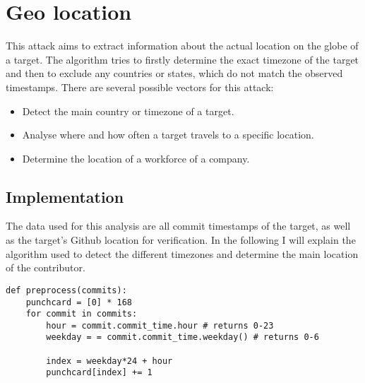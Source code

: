 \section{Geo location}

This attack aims to extract information about the actual location on the globe of a target.
The algorithm tries to firstly determine the exact timezone of the target and then to exclude any countries or states, which do not match the observed timestamps.
There are several possible vectors for this attack:

\begin{itemize}
    \item Detect the main country or timezone of a target.
    \item Analyse where and how often a target travels to a specific location.
    \item Determine the location of a workforce of a company.
\end{itemize}


\subsection{Implementation}\label{travel-implementation}

The data used for this analysis are all commit timestamps of the target, as well as the target's Github location for verification.
In the following I will explain the algorithm used to detect the different timezones and determine the main location of the contributor.

\begin{verbatim}
def preprocess(commits):
    punchcard = [0] * 168
    for commit in commits:
        hour = commit.commit_time.hour # returns 0-23
        weekday = = commit.commit_time.weekday() # returns 0-6

        index = weekday*24 + hour
        punchcard[index] += 1

\end{verbatim}
\begingroup
{}\label{lst:travel-analysis}
\endgroup

